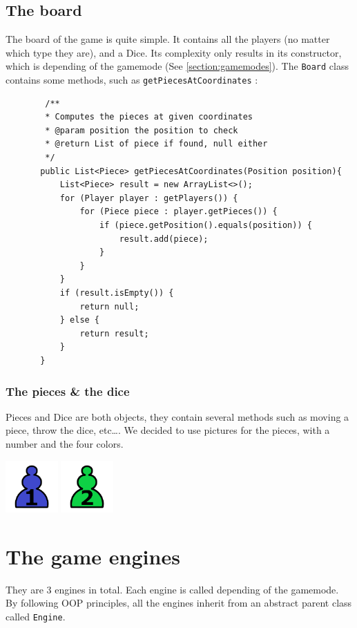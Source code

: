 \documentclass[english, 11pt, titlepage]{article}
\begin{document}
    \subsection{The board}
    The board of the game is quite simple. It contains all the players (no matter which type they are), and a Dice. Its complexity only results in its constructor, which is depending of the gamemode (See \autoref{section:gamemodes}). The \verb|Board| class contains some methods, such as \verb|getPiecesAtCoordinates| :
    \begin{lstlisting}
        /**
        * Computes the pieces at given coordinates
        * @param position the position to check
        * @return List of piece if found, null either
        */
       public List<Piece> getPiecesAtCoordinates(Position position){
           List<Piece> result = new ArrayList<>();
           for (Player player : getPlayers()) {
               for (Piece piece : player.getPieces()) {
                   if (piece.getPosition().equals(position)) {
                       result.add(piece);
                   }
               }
           }
           if (result.isEmpty()) {
               return null;
           } else {
               return result;
           }
       }   
    \end{lstlisting}
    \subsubsection{The pieces \& the dice}
    Pieces and Dice are both objects, they contain several methods such as moving a piece, throw the dice, etc\dots. We decided to use pictures for the pieces, with a number and the four colors.

    \begin{center}
        \includegraphics[width=2cm]{pieceBlue1.png}
        \hspace{2cm}
        \includegraphics[width=2cm]{pieceGreen2.png}
    \end{center}

    \section{The game engines}
    They are 3 engines in total. Each engine is called depending of the gamemode. By following OOP principles, all the engines inherit from an abstract parent class called \verb|Engine|.
\end{document}
